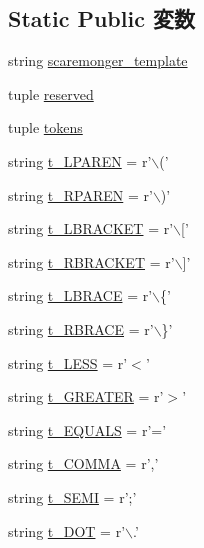 \subsection*{Static Public 変数}
\begin{DoxyCompactItemize}
\item 
string \hyperlink{classisa__parser_1_1ISAParser_a1ffc37bc1a95ff6b59642af9b3ac16bc}{scaremonger\_\-template}
\item 
tuple \hyperlink{classisa__parser_1_1ISAParser_a7c0da508b820c6b4db51430d694f6d8b}{reserved}
\item 
tuple \hyperlink{classisa__parser_1_1ISAParser_a8949ccb05d719d97020ab994d6044eef}{tokens}
\item 
string \hyperlink{classisa__parser_1_1ISAParser_ad14d955b6dac0ada266c435f2035bc4d}{t\_\-LPAREN} = r'$\backslash$('
\item 
string \hyperlink{classisa__parser_1_1ISAParser_a4ea1c85333f617e3ca898b753e15d35f}{t\_\-RPAREN} = r'$\backslash$)'
\item 
string \hyperlink{classisa__parser_1_1ISAParser_a4f72efb081dc4228f62d6b65738d2637}{t\_\-LBRACKET} = r'$\backslash$\mbox{[}'
\item 
string \hyperlink{classisa__parser_1_1ISAParser_a87e348a4eb49cf979789824102256d3f}{t\_\-RBRACKET} = r'$\backslash$\mbox{]}'
\item 
string \hyperlink{classisa__parser_1_1ISAParser_a6a55f0ac133ba86d36aa12338ee79230}{t\_\-LBRACE} = r'$\backslash$\{'
\item 
string \hyperlink{classisa__parser_1_1ISAParser_a9efa468b6e23fb5c1ea26ff00488c882}{t\_\-RBRACE} = r'$\backslash$\}'
\item 
string \hyperlink{classisa__parser_1_1ISAParser_ac4d2ff69eb7a1f2f466487b4edc5aa73}{t\_\-LESS} = r'$<$'
\item 
string \hyperlink{classisa__parser_1_1ISAParser_aab421ba527599b805e801d50317189c1}{t\_\-GREATER} = r'$>$'
\item 
string \hyperlink{classisa__parser_1_1ISAParser_a0b554788662d24d2503f59b5ab0401ae}{t\_\-EQUALS} = r'='
\item 
string \hyperlink{classisa__parser_1_1ISAParser_a137b090057722e95d282227a19de9449}{t\_\-COMMA} = r','
\item 
string \hyperlink{classisa__parser_1_1ISAParser_ab8d53d69162fbf62527f1422ae358e37}{t\_\-SEMI} = r';'
\item 
string \hyperlink{classisa__parser_1_1ISAParser_a06100043442f036a0af5b0a0a2bce35e}{t\_\-DOT} = r'$\backslash$.'
\item 

\end{DoxyCompactItemize}
